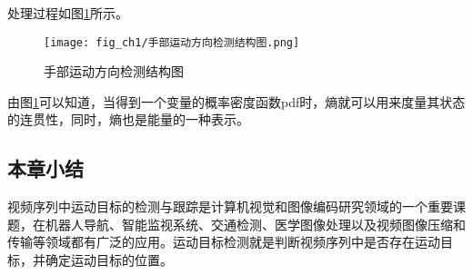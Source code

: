 处理过程如图\ref{fig:手部运动方向检测结构图}所示。
\begin{figure}[H]
  \centering
  \texttt{[image: fig\_ch1/手部运动方向检测结构图.png]}
  \caption{手部运动方向检测结构图}
  \label{fig:手部运动方向检测结构图}
\end{figure}

由图\ref{fig:手部运动方向检测结构图}可以知道，当得到一个变量的概率密度函数pdf时，熵就可以用来度量其状态的连贯性，同时，熵也是能量的一种表示。

\subsection{本章小结}

视频序列中运动目标的检测与跟踪是计算机视觉和图像编码研究领域的一个重要课题，在机器人导航、智能监视系统、交通检测、医学图像处理以及视频图像压缩和传输等领域都有广泛的应用。运动目标检测就是判断视频序列中是否存在运动目标，并确定运动目标的位置。
